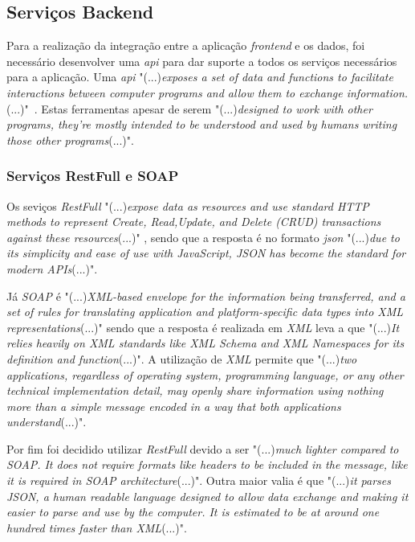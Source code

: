 \subsection{Serviços Backend}

Para a realização da integração entre a aplicação \emph{frontend} e os dados, foi necessário desenvolver uma \textit{\acrfull{api}} para dar suporte a todos os serviços necessários para a aplicação.
Uma \textit{\acrshort{api}} "(...)\emph{exposes a set of data and functions to facilitate interactions between computer programs and allow them to exchange information.}(...)"~\citep{rest_cookbook}.
Estas ferramentas apesar de serem "(...)\emph{designed to work with other programs, they’re mostly intended to be understood and used by humans writing those other programs}(...)"\citep{api_design}.

\newpage

\subsubsection{Serviços RestFull e SOAP}
Os seviços \emph{RestFull} "(...)\emph{expose data as resources and use standard HTTP methods to represent Create, Read,Update, and Delete (CRUD) transactions against these resources}(...)"
\citep{api_design}, sendo que a resposta é no formato \textit{\acrfull{json}} "(...)\emph{due to its simplicity and ease of use with JavaScript, JSON has become the standard for modern APIs}(...)"\citep{api_design}.

Já \emph{SOAP} é "(...)\emph{XML-based envelope for the information being transferred, and a set of rules for translating application and platform-specific data types into XML representations}(...)"\citep{Snell2002} sendo que a resposta é realizada em \emph{XML} leva a que "(...)\emph{It relies heavily on XML standards like XML Schema and XML Namespaces for its definition and function}(...)"\citep{Snell2002}. A utilização de \emph{XML} permite que "(...)\emph{two applications, regardless of operating system, programming language, or any other technical implementation detail, may openly share information using nothing more than a simple message encoded in a way that both applications understand}(...)"\citep{Snell2002}.

Por fim foi decidido utilizar \emph{RestFull} devido a ser "(...)\emph{much lighter compared to SOAP. It does not require formats like headers to be included in the message, like it is required in SOAP architecture}(...)"\citep{Halili2018}. Outra maior valia é que "(...)\emph{it parses JSON, a human readable language designed to allow data exchange and making it easier to parse and use by the computer. It is estimated to be at around one hundred times faster than XML}(...)"\citep{Halili2018}.

